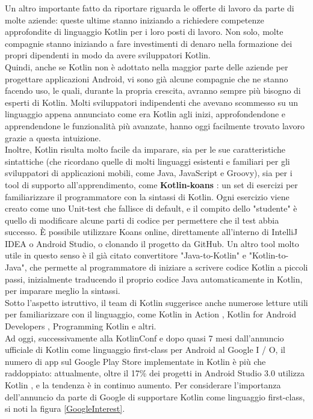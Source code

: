 Un altro importante fatto da riportare riguarda le offerte di lavoro da parte di molte aziende: queste ultime stanno iniziando a richiedere competenze approfondite di linguaggio Kotlin per i loro posti di lavoro. Non solo, molte compagnie stanno iniziando a fare investimenti di denaro nella formazione dei propri dipendenti in modo da avere sviluppatori Kotlin.\\
Quindi, anche se Kotlin non è adottato nella maggior parte delle aziende per progettare applicazioni Android, vi sono già alcune compagnie che ne stanno facendo uso, le quali, durante la propria crescita, avranno sempre più bisogno di esperti di Kotlin. Molti sviluppatori indipendenti che avevano scommesso su un linguaggio appena annunciato come era Kotlin agli inizi, approfondendone e apprendendone le funzionalità più avanzate, hanno oggi facilmente trovato lavoro grazie a questa intuizione.\\

Inoltre, Kotlin risulta molto facile da imparare, sia per le sue caratteristiche sintattiche (che ricordano quelle di molti linguaggi esistenti e familiari per gli sviluppatori di applicazioni mobili, come Java, JavaScript e Groovy), sia per i tool di supporto all'apprendimento, come {\bfseries Kotlin-koans} \cite{kotlinKoans}: un set di esercizi per familiarizzare il programmatore con la sintassi di Kotlin. Ogni esercizio viene creato come uno Unit-test che fallisce di default, e il compito dello "studente" è quello di modificare alcune parti di codice per permettere che il test abbia successo. È possibile utilizzare Koans online, direttamente all'interno di IntelliJ IDEA o Android Studio, o clonando il progetto da GitHub. Un altro tool molto utile in questo senso è il già citato convertitore "Java-to-Kotlin" e "Kotlin-to-Java", che permette al programmatore di iniziare a scrivere codice Kotlin a piccoli passi, inizialmente traducendo il proprio codice Java automaticamente in Kotlin, per imparare meglio la sintassi.\\
Sotto l'aspetto istruttivo, il team di Kotlin suggerisce anche numerose letture utili per familiarizzare con il linguaggio, come
Kotlin in Action \cite{kaction}, Kotlin for Android Developers \cite{leiva}, Programming Kotlin \cite{programmingKotlin} e altri.\\

Ad oggi, successivamente alla KotlinConf e dopo quasi 7 mesi dall'annuncio ufficiale di Kotlin come linguaggio first-class per Android al Google I / O, il numero di app sul Google Play Store implementate in Kotlin è più che raddoppiato: attualmente, oltre il 17\% dei progetti in Android Studio 3.0 utilizza Kotlin \cite{ktUpdateAndroidDevBlog}, e la tendenza è in continuo aumento. Per considerare l'importanza dell'annuncio da parte di Google di supportare Kotlin come linguaggio first-class, si noti la figura \ref{GoogleInterest}.\\
\\
\\

